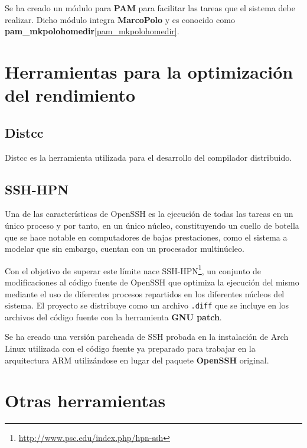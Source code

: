 Se ha creado un módulo para \textbf{PAM} para facilitar las tareas que el sistema debe realizar. Dicho módulo integra \textbf{MarcoPolo} y es conocido como \textbf{pam\_mkpolohomedir}\ref{pam_mkpolohomedir}.

\section{Herramientas para la optimización del rendimiento}

\subsection{Distcc}

Distcc es la herramienta utilizada para el desarrollo del compilador distribuido.\citationneeded[TODO]

\subsection{SSH-HPN}

Una de las características de OpenSSH es la ejecución de todas las tareas en un único proceso y por tanto, en un único núcleo, constituyendo un cuello de botella que se hace notable en computadores de bajas prestaciones, como el sistema a modelar que sin embargo, cuentan con un procesador multinúcleo.

Con el objetivo de superar este límite nace SSH-HPN\footnote{\href{http://www.psc.edu/index.php/hpn-ssh}{http://www.psc.edu/index.php/hpn-ssh}}, un conjunto de modificaciones al código fuente de OpenSSH que optimiza la ejecución del mismo mediante el uso de diferentes procesos repartidos en los diferentes núcleos del sistema. El proyecto se distribuye como un archivo \texttt{.diff} que se incluye en los archivos del código fuente con la herramienta \textbf{GNU patch}.

Se ha creado una versión parcheada de SSH probada en la instalación de Arch Linux utilizada con el código fuente ya preparado para trabajar en la arquitectura ARM utilizándose en lugar del paquete \textbf{OpenSSH} original.

\section{Otras herramientas}


